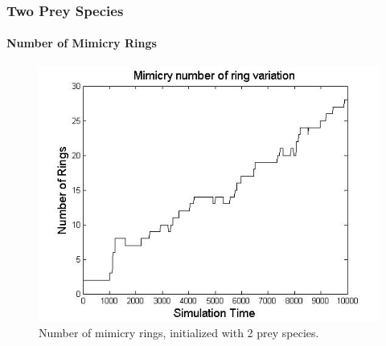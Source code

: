 \frame
{
	\frametitle{Two Prey Species}
	\framesubtitle{Number of Mimicry Rings}

	\begin{figure}[H]
		\centering
		\includegraphics[scale=0.30]{../tex/images/ringSize10k-2Prey}
		\caption{Number of mimicry rings, initialized with 2 prey species.}
		\label{fig:ringSize10k-2Prey}
	\end{figure}	
}

